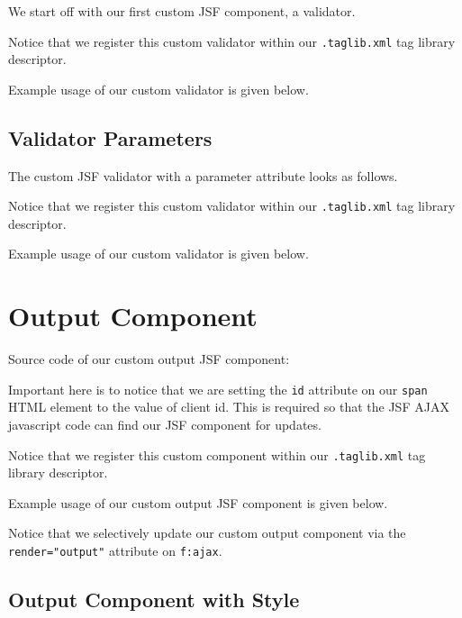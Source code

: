 We start off with our first custom JSF component, a validator.


Notice that we register this custom validator within our \texttt{.taglib.xml} tag library descriptor.

Example usage of our custom validator is given below.


\subsection{Validator Parameters}

The custom JSF  validator with a parameter attribute looks as follows.


Notice that we register this custom validator within our \texttt{.taglib.xml} tag library descriptor.

Example usage of our custom validator is given below.


\section{Output Component}

Source code of our custom output JSF component:


Important here is to notice that we are setting the \texttt{id} attribute on our \texttt{span} HTML element to the value of client id.
This is required so that the JSF AJAX javascript code can find our JSF component for updates.

Notice that we register this custom component within our \texttt{.taglib.xml} tag library descriptor.

Example usage of our custom output JSF component is given below.


Notice that we selectively update our custom output component via the \texttt{render="output"} attribute on \texttt{f:ajax}.

\subsection{Output Component with Style}

